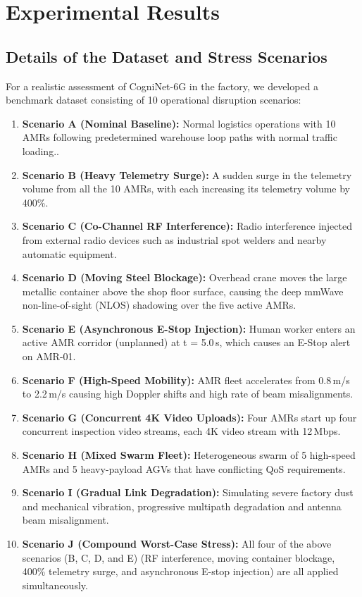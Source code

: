 \documentclass[twocolumn,10pt,twoside]{article}
\begin{document}
\clearpage
\section{Experimental Results}
\subsection{Details of the Dataset and Stress Scenarios}
For a realistic assessment of CogniNet-6G in the factory, we developed a benchmark dataset consisting of 10 operational disruption scenarios:
\begin{enumerate}
    \item \textbf{Scenario A (Nominal Baseline):} Normal logistics operations with 10 AMRs following predetermined warehouse loop paths with normal traffic loading..
    \item \textbf{Scenario B (Heavy Telemetry Surge):} A sudden surge in the telemetry volume from all the 10 AMRs, with each increasing its telemetry volume by 400\%.
    \item \textbf{Scenario C (Co-Channel RF Interference):} Radio interference injected from external radio devices such as industrial spot welders and nearby automatic equipment.
    \item \textbf{Scenario D (Moving Steel Blockage):} Overhead crane moves the large metallic container above the shop floor surface, causing the deep mmWave non-line-of-sight (NLOS) shadowing over the five active AMRs.
    \item \textbf{Scenario E (Asynchronous E-Stop Injection):} Human worker enters an active AMR corridor (unplanned) at t = 5.0\,s, which causes an E-Stop alert on AMR-01.
    \item \textbf{Scenario F (High-Speed Mobility):} AMR fleet accelerates from 0.8\,m/s to 2.2\,m/s causing high Doppler shifts and high rate of beam misalignments.
    \item \textbf{Scenario G (Concurrent 4K Video Uploads):} Four AMRs start up four concurrent inspection video streams, each 4K video stream with 12\,Mbps.
    \item \textbf{Scenario H (Mixed Swarm Fleet):} Heterogeneous swarm of 5 high-speed AMRs and 5 heavy-payload AGVs that have conflicting QoS requirements.
    \item \textbf{Scenario I (Gradual Link Degradation):} Simulating severe factory dust and mechanical vibration, progressive multipath degradation and antenna beam misalignment.
    \item \textbf{Scenario J (Compound Worst-Case Stress):} All four of the above scenarios (B, C, D, and E) (RF interference, moving container blockage, 400\% telemetry surge, and asynchronous E-stop injection) are all applied simultaneously.
\end{enumerate}
\end{document}
